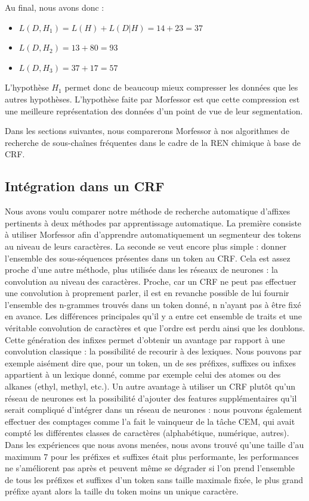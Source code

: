 \documentclass[12pt,a4paper,times,twoside,openright]{report}
\begin{document}
Au final, nous avons donc :

\begin{itemize}
    \item $L(D,H_{1}) = L(H) + L(D|H) = 14 + 23 = 37$
    \item $L(D,H_{2}) = 13 + 80 = 93$
    \item $L(D,H_{3}) = 37 + 17 = 57$
\end{itemize}

L'hypothèse $H_{1}$ permet donc de beaucoup mieux compresser les données que les autres hypothèses. L'hypothèse faite par Morfessor est que cette compression est une meilleure représentation des données d'un point de vue de leur segmentation.

Dans les sections suivantes, nous comparerons Morfessor à nos algorithmes de recherche de sous-chaînes fréquentes dans le cadre de la REN chimique à base de CRF.


        
        \subsection{Intégration dans un CRF}
        \label{subsec:CRF-morphology}
Nous avons voulu comparer notre méthode de recherche automatique d'affixes pertinents à deux méthodes par apprentissage automatique. La première consiste à utiliser Morfessor afin d'apprendre automatiquement un segmenteur des tokens au niveau de leurs caractères. La seconde se veut encore plus simple : donner l'ensemble des sous-séquences présentes dans un token au CRF. Cela est assez proche d'une autre méthode, plus utilisée dans les réseaux de neurones : la convolution au niveau des caractères. Proche, car un CRF ne peut pas effectuer une convolution à proprement parler, il est en revanche possible de lui fournir l'ensemble des n-grammes trouvés dans un token donné, n n'ayant pas à être fixé en avance. Les différences principales qu'il y a entre cet ensemble de traits et une véritable convolution de caractères et que l'ordre est perdu ainsi que les doublons. Cette génération des infixes permet d'obtenir un avantage par rapport à une convolution classique : la possibilité de recourir à des lexiques. Nous pouvons par exemple aisément dire que, pour un token, un de ses préfixes, suffixes ou infixes appartient à un lexique donné, comme par exemple celui des atomes ou des alkanes (ethyl, methyl, etc.). Un autre avantage à utiliser un CRF plutôt qu'un réseau de neurones est la possibilité d'ajouter des features supplémentaires qu'il serait compliqué d'intégrer dans un réseau de neurones : nous pouvons également effectuer des comptages comme l'a fait le vainqueur de la tâche CEM, qui avait compté les différentes classes de caractères (alphabétique, numérique, autres). Dans les expériences que nous avons menées, nous avons trouvé qu'une taille d'au maximum 7 pour les préfixes et suffixes était plus performante, les performances ne s'améliorent pas après et peuvent même se dégrader si l'on prend l'ensemble de tous les préfixes et suffixes d'un token sans taille maximale fixée, le plus grand préfixe ayant alors la taille du token moins un unique caractère.
\end{document}
